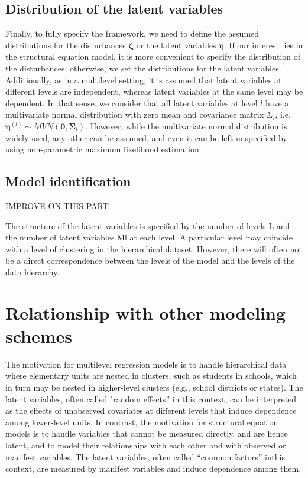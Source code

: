 \subsection{Distribution of the latent variables}
Finally, to fully specify the framework, we need to define the assumed distributions for the disturbances $\pmb{\zeta}$ or the latent variables $\pmb{\eta}$. If our interest lies in the structural equation model, it is more convenient to specify the distribution of the disturbances; otherwise, we set the distributions for the latent variables. Additionally, as in a multilevel setting, it is assumed that latent variables at different levels are independent, whereas latent variables at the same level may be dependent. In that sense, we consider that all latent variables at level $l$ have a multivariate normal distribution with zero mean and covariance matrix $\Sigma_{l}$, i.e. $\pmb{\eta}^{(l)} \sim MVN(\mathbf{0}, \pmb{\Sigma}_{l})$. However, while the multivariate normal distribution is widely used, any other can be assumed, and even it can be left unspecified by using non-parametric maximum likelihood estimation \citep{Rabe_et_al_2003b}



\subsection{Model identification}
{\color{red} IMPROVE ON THIS PART
	
	The structure of the latent variables is specified by the number of levels L and the number
	of latent variables Ml at each level. A particular level may coincide with a level of clustering in the hierarchical dataset. However, there will often not be a direct correspondence between the levels of the model and the levels of the data hierarchy.
}


\section{Relationship with other modeling schemes}

\citet{Rabe_et_al_2012}

{\color{red} The motivation for multilevel regression models is to handle hierarchical data where elementary units are nested in clusters, such as students in schools, which in
turn may be nested in higher-level clusters (e.g., school districts or states). The latent variables, often called "random effects” in this context, can be interpreted as
the effects of unobserved covariates at different levels that induce dependence among lower-level units. In contrast, the motivation for structural equation models is to
handle variables that cannot be measured directly, and are hence latent, and to model their relationships with each other and with observed or manifest variables.
The latent variables, often called “common factors” inthis context, are measured by manifest variables and induce dependence among them.}


